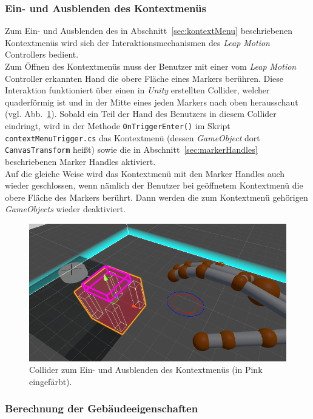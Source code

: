 \subsubsection{Ein- und Ausblenden des Kontextmenüs} \label{sec:KontextMenuSwitch}
Zum Ein- und Ausblenden des in Abschnitt~\ref{sec:kontextMenu} beschriebenen Kontextmenüs wird sich der Interaktionsmechanismen des \emph{Leap Motion} Controllers bedient.\\
Zum Öffnen des Kontextmenüs muss der Benutzer mit einer vom \emph{Leap Motion} Controller erkannten Hand die obere Fläche eines Markers berühren. Diese Interaktion funktioniert über einen in \emph{Unity} erstellten Collider, welcher quaderförmig ist und in der Mitte eines jeden Markers nach oben herausschaut (vgl. Abb.~\ref{fig:KontextmenuCollider}). Sobald ein Teil der Hand des Benutzers in diesem Collider eindringt, wird in der Methode \texttt{OnTriggerEnter()} im Skript \texttt{contextMenuTrigger.cs} das Kontextmenü (dessen \emph{GameObject} dort \texttt{CanvasTransform} heißt) sowie die in Abschnitt~\ref{sec:markerHandles} beschriebenen Marker Handles aktiviert.\\
Auf die gleiche Weise wird das Kontextmenü mit den Marker Handles auch wieder geschlossen, wenn nämlich der Benutzer bei geöffnetem Kontextmenü die obere Fläche des Markers berührt. Dann werden die zum Kontextmenü gehörigen \emph{GameObjects} wieder deaktiviert.

\begin{figure}
	\centering
	\includegraphics[width=\textwidth]{Bilder/Contextmenu_Collider}
	\caption{Collider zum Ein- und Ausblenden des Kontextmenüs (in Pink eingefärbt).}
	\label{fig:KontextmenuCollider}
\end{figure}

\subsubsection{Berechnung der Gebäudeeigenschaften} \label{sec:KontextMenuInhalt}

